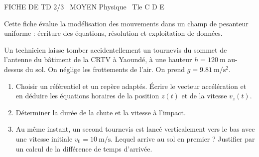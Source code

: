 \documentclass[11pt]{article}
\begin{document}
\begin{tcolorbox}[enhanced,colback=popink,colframe=popink,arc=10pt,boxrule=0pt,left=12pt,right=12pt,top=9pt,bottom=9pt]
{\color{white}\popxbold\small FICHE DE TD 2/3 \textbullet\ MOYEN \hfill Physique \textbullet\ Tle C D E\par}
\end{tcolorbox}
\vspace{4pt}
Cette fiche évalue la modélisation des mouvements dans un champ de pesanteur uniforme : écriture des équations, résolution et exploitation de données.

\begin{exercice}
Un technicien laisse tomber accidentellement un tournevis du sommet de l'antenne du bâtiment de la CRTV à Yaoundé, à une hauteur $h = \SI{120}{\meter}$ au-dessus du sol. On néglige les frottements de l'air. On prend $g = \SI{9,81}{\meter\per\second\squared}$.
\begin{enumerate}
    \item Choisir un référentiel et un repère adaptés. Écrire le vecteur accélération et en déduire les équations horaires de la position $z(t)$ et de la vitesse $v_z(t)$.
    \item Déterminer la durée de la chute et la vitesse à l'impact.
    \item Au même instant, un second tournevis est lancé verticalement vers le bas avec une vitesse initiale $v_0 = \SI{10}{\meter\per\second}$. Lequel arrive au sol en premier ? Justifier par un calcul de la différence de temps d'arrivée.
\end{enumerate}
\end{exercice}
\end{document}
